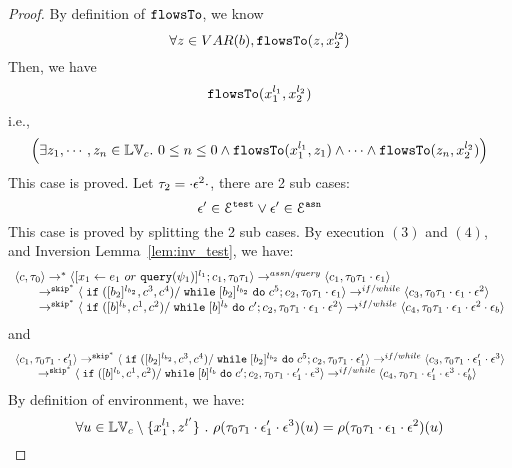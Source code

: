 {\begin{proof}
 By definition of $\mathtt{flowsTo}$, we know
 \[
 \forall z \in VAR(b), \mathtt{flowsTo}(z, x_2^{l2})
 \]
 Then, we have
 \[
 \mathtt{flowsTo}(x_1^{l_1}, x_2^{l_2})
 \]
 i.e.,
 \[
 \Big( \exists z_1, \cdots, z_n \in \mathbb{LV}_{{c}}. ~ 0 \leq n \leq 0 \land
  \mathtt{flowsTo}(x_1^{l_1}, z_1) 
  \land \cdots \land \mathtt{flowsTo}(z_n, x_2^{l_2}) \Big)
 \]
 This case is proved.
%
 Let $\mathtt{\tau}_2 = \cdot \mathtt{\epsilon}^2 \cdot$, there are 2 sub cases: 
 \[
 \mathtt{\epsilon}' \in \mathcal{E}^{\mathtt{{test}}} \lor \mathtt{\epsilon}' \in \mathcal{E}^{\mathtt{{asn}}}
 \]
 This case is proved by splitting the 2 sub cases.
 \subcaseL{$\event^2 \in \eventset^{\test}$}
By execution $(3)$ and $(4)$, and {Inversion Lemma~\ref{lem:inv_test}}, we have:
%
\[
  \begin{array}{l}   
  \langle {c}, \mathtt{\tau}_0 \rangle 
  \rightarrow^{*} 
  \langle [\mathrel{ {x}_1 \leftarrow e_1~ or ~ {\tt query}(\psi_1) }]^{l_1} ; {c}_1, \mathtt{\tau}_0 \mathtt{\tau}_1 \rangle  \rightarrow^{assn/query}
 \langle c_1, \mathtt{\tau}_0 \mathtt{\tau}_1 \cdot \mathtt{\epsilon}_1 \rangle 
  \\ 
  \qquad \rightarrow^{\mathtt{skip}^*} 
  \langle \;\mathtt{if}\;([b_2]{}^{l_{b_2}}, c^3, c^4) / \;\mathtt{while}\; [b_2]{}^{l_{b_2}} \;\mathtt{do}\; c^5; {c}_2, 
  \mathtt{\tau}_0 \mathtt{\tau}_1 \cdot \mathtt{\epsilon}_1 \rangle 
  \rightarrow^{if / while} 
  \langle {c}_3,  \mathtt{\tau}_0 \mathtt{\tau}_1 \cdot \mathtt{\epsilon}_1 \cdot \mathtt{\epsilon}^2 \rangle 
  \\ 
  \qquad \rightarrow^{\mathtt{skip}^*} 
  \langle \;\mathtt{if}\;([b]{}^{l_b}, c^1, c^2) / \;\mathtt{while}\; [b]{}^{l_b} \;\mathtt{do}\; c'; {c}_2, 
  \mathtt{\tau}_0 \mathtt{\tau}_1 \cdot \mathtt{\epsilon}_1\cdot \mathtt{\epsilon}^2 \rangle 
  \rightarrow^{if / while} 
  \langle {c}_4,  \mathtt{\tau}_0 \mathtt{\tau}_1 \cdot \mathtt{\epsilon}_1 \cdot \mathtt{\epsilon}^2 \cdot \mathtt{\epsilon}_b \rangle 
\end{array}
 \]
and 
 \[
  \begin{array}{l}   
  \langle c_1, \mathtt{\tau}_0 \mathtt{\tau}_1 \cdot \mathtt{\epsilon}_1' \rangle 
 \rightarrow^{\mathtt{skip}^*} 
  \langle \;\mathtt{if}\;([b_2]{}^{l_{b_2}}, c^3, c^4) / \;\mathtt{while}\; [b_2]{}^{l_{b_2}} \;\mathtt{do}\; c^5; {c}_2, 
  \mathtt{\tau}_0 \mathtt{\tau}_1 \cdot \mathtt{\epsilon}_1' \rangle 
  \rightarrow^{if / while} 
  \langle {c}_3,  \mathtt{\tau}_0 \mathtt{\tau}_1 \cdot \mathtt{\epsilon}_1' \cdot \mathtt{\epsilon}^3 \rangle 
  \\ 
  \qquad \rightarrow^{\mathtt{skip}^*} 
  \langle \;\mathtt{if}\;([b]{}^{l_b}, c^1, c^2) / \;\mathtt{while}\; [b]{}^{l_b} \;\mathtt{do}\; c'; {c}_2, 
  \mathtt{\tau}_0 \mathtt{\tau}_1 \cdot \mathtt{\epsilon}_1' \cdot \mathtt{\epsilon}^3 \rangle 
  \rightarrow^{if / while} 
  \langle {c}_4,  \mathtt{\tau}_0 \mathtt{\tau}_1 \cdot \mathtt{\epsilon}_1' \cdot \mathtt{\epsilon}^3 \cdot \mathtt{\epsilon}_b' \rangle 
\end{array}
 \]
 By definition of environment, we have:
\[
  \forall u \in \mathbb{LV}_c \setminus \{x_1^{l_1}, z^{l'}\} ~.~
  \rho(\mathtt{\tau}_0 \mathtt{\tau}_1 \cdot \mathtt{\epsilon}_1' \cdot \mathtt{\epsilon}^3) (u) =  
  \rho(\mathtt{\tau}_0 \mathtt{\tau}_1 \cdot \mathtt{\epsilon}_1 \cdot \mathtt{\epsilon}^2) (u)
\]
\end{proof}}
